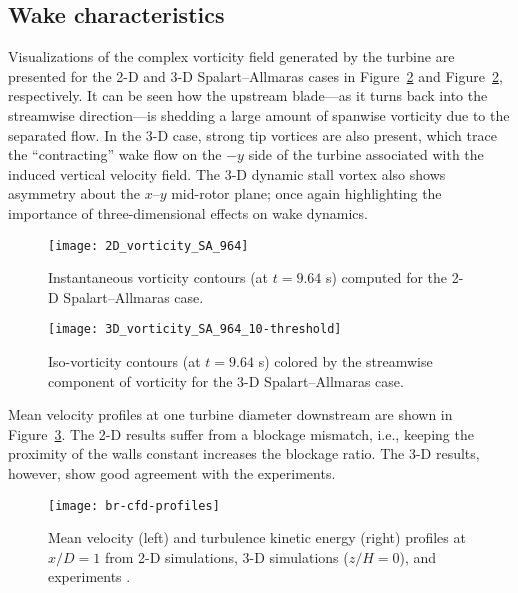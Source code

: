 \subsection{Wake characteristics}

Visualizations of the complex vorticity field generated by the turbine are
presented for the 2-D and 3-D Spalart--Allmaras cases in
Figure~\ref{fig:br-vorticity-3d} and Figure~\ref{fig:br-vorticity-3d},
respectively. It can be seen how the upstream blade---as it turns back into the
streamwise direction---is shedding a large amount of spanwise vorticity due to
the separated flow. In the 3-D case, strong tip vortices are also present, which
trace the ``contracting'' wake flow on the $-y$ side of the turbine associated
with the induced vertical velocity field. The 3-D dynamic stall vortex also
shows asymmetry about the $x$--$y$ mid-rotor plane; once again highlighting the
importance of three-dimensional effects on wake dynamics.

\begin{figure}
    \centering
    
    \texttt{[image: 2D\_vorticity\_SA\_964]}

    \caption{Instantaneous vorticity contours (at $t=9.64$ s) computed for the
        2-D Spalart--Allmaras case.}

    \label{fig:br-vorticity-2d}
\end{figure}

\begin{figure}
    \centering

    \texttt{[image: 3D\_vorticity\_SA\_964\_10-threshold]}

    \caption{Iso-vorticity contours (at $t=9.64$ s) colored by the streamwise
        component of vorticity for the 3-D Spalart--Allmaras case.}

    \label{fig:br-vorticity-3d}
\end{figure}

Mean velocity profiles at one turbine diameter downstream are shown in
Figure~\ref{fig:br-cfd-profiles}. The 2-D results suffer from a blockage
mismatch, i.e., keeping the proximity of the walls constant increases the
blockage ratio. The 3-D results, however, show good agreement with the
experiments.

\begin{figure}
    \centering

    \texttt{[image: br-cfd-profiles]}

    \caption{Mean velocity (left) and turbulence kinetic energy (right) profiles
        at $x/D=1$ from 2-D simulations, 3-D simulations ($z/H=0$), and experiments
        \cite{Bachant2015-JoT}.}

    \label{fig:br-cfd-profiles}
\end{figure}

